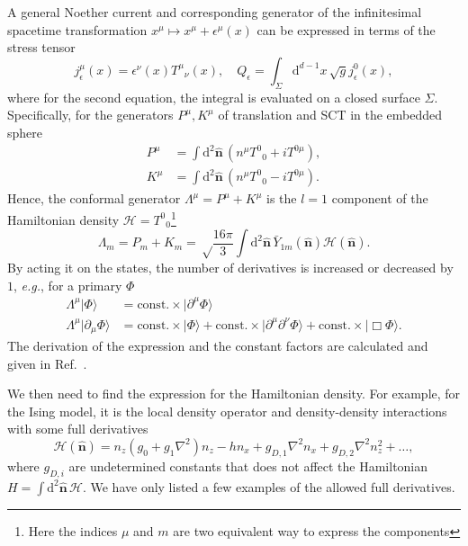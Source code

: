 \documentclass{timesjhep}
\begin{document}
A general Noether current and corresponding generator of the infinitesimal spacetime transformation $x^\mu\mapsto x^\mu+\epsilon^\mu(x)$ can be expressed in terms of the stress tensor
\begin{equation}
    j_\epsilon^\mu(x)=\epsilon^\nu(x)T^\mu{}_\nu(x),\quad Q_\epsilon=\int_\Sigma\mathrm{d}^{d-1}x\,\sqrt{g}j_\epsilon^0(x),
\end{equation}
where for the second equation, the integral is evaluated on a closed surface $\Sigma$. Specifically, for the generators $P^\mu,K^\mu$ of translation and SCT in the embedded sphere
\begin{align}
    P^\mu&=\int\mathrm{d}^2\hat{\mathbf{n}}\,(n^\mu T^0{}_0+iT^{0\mu}),\nonumber\\ K^\mu&=\int\mathrm{d}^2\hat{\mathbf{n}}\,(n^\mu T^0{}_0-iT^{0\mu}).
\end{align}
Hence, the conformal generator $\Lambda^\mu=P^\mu+K^\mu$ is the $l=1$ component of the Hamiltonian density $\mathcal{H}=T^0{}_0$\footnote{Here the indices $\mu$ and $m$ are two equivalent way to express the components}
\begin{equation}
    \Lambda_m=P_m+K_m=\sqrt\frac{16\pi}{3}\int\mathrm{d}^2\hat{\mathbf{n}}\,\bar{Y}_{1m}(\hat{\mathbf{n}})\mathcal{H}(\hat{\mathbf{n}}).
\end{equation}
By acting it on the states, the number of derivatives is increased or decreased by $1$, \textit{e.g.}, for a primary $\Phi$
\begin{align}
    \Lambda^\mu|\Phi\rangle&=\textrm{const.}\times|\partial^\mu\Phi\rangle\nonumber\\     \Lambda^\mu|\partial_\mu\Phi\rangle&=\textrm{const.}\times|\Phi\rangle+\textrm{const.}\times|\partial^\mu\partial^\nu\Phi\rangle+\textrm{const.}\times|\Box\Phi\rangle.
\end{align}
The derivation of the expression and the constant factors are calculated and given in Ref.~\cite{Fardelli2024,Fan2024}.

We then need to find the expression for the Hamiltonian density. For example, for the Ising model, it is the local density operator and density-density interactions with some full derivatives
\begin{equation}
    \mathcal{H}(\hat{\mathbf{n}})=n_z\left(g_0+g_1\nabla^2\right)n_z-hn_x+g_{D,1}\nabla^2n_x+g_{D,2}\nabla^2n_z^2+\dots,
\end{equation}
where $g_{D,i}$ are undetermined constants that does not affect the Hamiltonian $H=\int\mathrm{d}^2\hat{\mathbf{n}}\,\mathcal{H}$. We have only listed a few examples of the allowed full derivatives.
\end{document}
